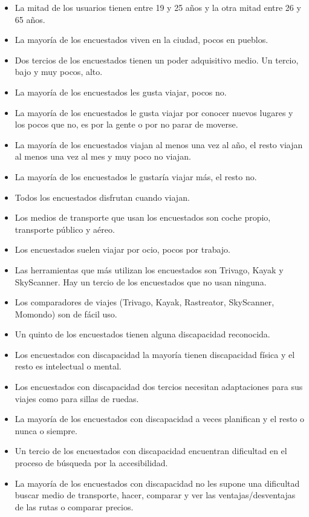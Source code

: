 \begin{itemize}
    \item La mitad de los usuarios tienen entre 19 y 25 años y la otra mitad entre 26 y 65 años.
    \item La mayoría de los encuestados viven en la ciudad, pocos en pueblos.
    \item Dos tercios de los encuestados tienen un poder adquisitivo medio. Un tercio, bajo y muy pocos, alto.
    \item La mayoría de los encuestados les gusta viajar, pocos no.
    \item La mayoría de los encuestados le gusta viajar por conocer nuevos lugares y los pocos que no, es por la gente o por no parar de moverse.
    \item La mayoría de los encuestados viajan al menos una vez al año, el resto viajan al menos una vez al mes y muy poco no viajan.
    \item La mayoría de los encuestados le gustaría viajar más, el resto no.
    \item Todos los encuestados disfrutan cuando viajan.
    \item Los medios de transporte que usan los encuestados son coche propio, transporte público y aéreo.
    \item Los encuestados suelen viajar por ocio, pocos por trabajo.
    \item Las herramientas que más utilizan los encuestados son Trivago, Kayak y SkyScanner. Hay un tercio de los encuestados que no usan ninguna.
    \item Los comparadores de viajes (Trivago, Kayak, Rastreator, SkyScanner, Momondo) son de fácil uso.
    \item Un quinto de los encuestados tienen alguna discapacidad reconocida.
    \item Los encuestados con discapacidad la mayoría tienen discapacidad física y el resto es intelectual o mental.
    \item Los encuestados con discapacidad dos tercios necesitan adaptaciones para sus viajes como para sillas de ruedas.
    \item La mayoría de los encuestados con discapacidad a veces planifican y el resto o nunca o siempre.
    \item Un tercio de los encuestados con discapacidad encuentran dificultad en el proceso de búsqueda por la accesibilidad.
    \item La mayoría de los encuestados con discapacidad no les supone una dificultad buscar medio de transporte, hacer, comparar y ver las ventajas/desventajas de las rutas o comparar precios.

\end{itemize}
